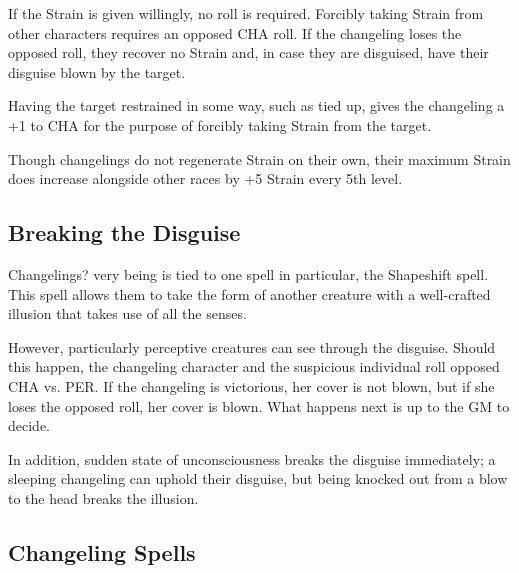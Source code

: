 \documentclass[11pt,a4paper,twocolumn]{book}
\begin{document}
	If the Strain is given willingly, no roll is required. Forcibly taking Strain from other characters requires an opposed CHA roll. If the changeling loses the opposed roll, they recover no Strain and, in case they are disguised, have their disguise blown by the target.
	
	Having the target restrained in some way, such as tied up, gives the changeling a +1 to CHA for the purpose of forcibly taking Strain from the target.
	
	Though changelings do not regenerate Strain on their own, their maximum Strain does increase alongside other races by +5 Strain every 5th level.
	
	\subsection*{Breaking the Disguise}
	Changelings? very being is tied to one spell in particular, the Shapeshift spell. This spell allows them to take the form of another creature with a well-crafted illusion that takes use of all the senses. 
	
	However, particularly perceptive creatures can see through the disguise. Should this happen, the changeling character and the suspicious individual roll opposed CHA vs. PER. If the changeling is victorious, her cover is not blown, but if she loses the opposed roll, her cover is blown. What happens next is up to the GM to decide.
	
	In addition, sudden state of unconsciousness breaks the disguise immediately; a sleeping changeling can uphold their disguise, but being knocked out from a blow to the head breaks the illusion.
	
	\subsection*{Changeling Spells}
	
	
	
	
	
	
	
	
	
   
\end{document}
